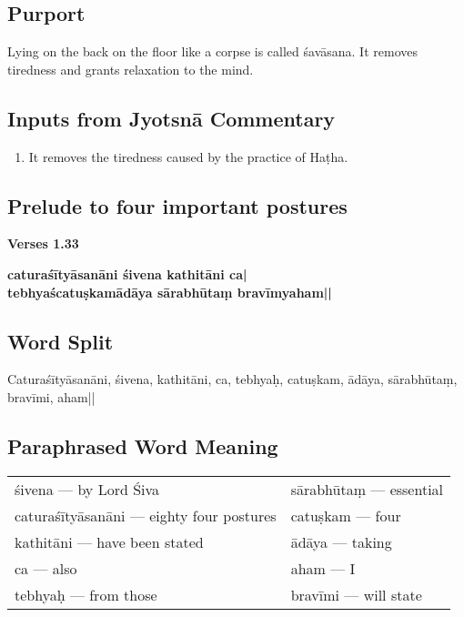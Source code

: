 \subsection*{Purport}

Lying on the back on the floor like a corpse is called śavāsana. It removes tiredness and grants relaxation to the mind. 

\subsection*{Inputs from Jyotsnā Commentary}

\begin{enumerate}
\item It removes the tiredness caused by the practice of Haṭha. 
\end{enumerate}

\subsection*{Prelude to four important postures}

\noindent 
\textbf{Verses 1.33}

\begin{shloka}
\textbf{caturaśītyāsanāni śivena kathitāni ca|}\\
\textbf{tebhyaścatuṣkamādāya sārabhūtaṃ bravīmyaham||}
\end{shloka}

\subsection*{Word Split}

Caturaśītyāsanāni, śivena, kathitāni, ca, tebhyaḥ, catuṣkam, ādāya, sārabhūtaṃ, bravīmi, aham||

\subsection*{Paraphrased Word Meaning}

\begin{longtable}{>{\noindent\raggedright}p{5cm}>{\noindent\raggedright}p{5cm}}
śivena --- by Lord Śiva & sārabhūtaṃ --- essential\tabularnewline
caturaśītyāsanāni --- eighty four postures  & catuṣkam --- four\tabularnewline
kathitāni --- have been stated  & ādāya --- taking\tabularnewline
ca --- also & aham  --- I\tabularnewline
tebhyaḥ --- from those & bravīmi --- will state
\end{longtable}

